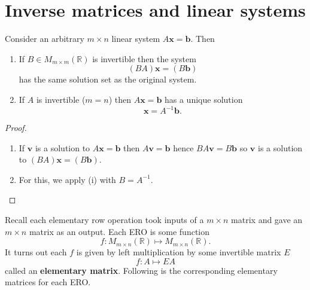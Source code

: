 \section{Inverse matrices and linear systems}

\begin{lemma}
    Consider an arbitrary $m\times n$ linear system $A\bm x=\bm b$. Then
    \begin{enumerate}
        \item If $B\in M_{m\times m}(\mathbb R)$ is invertible then the system \[(BA)\bm x=(B\bm b)\] has the same solution set as the original system.
        
        \item If $A$ is invertible ($m=n$) then $A\bm x=\bm b$ has a unique solution \[\bm x=A^{-1}\bm b.\]
    \end{enumerate}
\end{lemma}

\begin{proof}
    \begin{enumerate}
        \item If $\bm v$ is a solution to $A\bm x=\bm b$ then $A\bm v=\bm b$ hence $BA\bm v=B\bm b$ so $\bm v$ is a solution to $(BA)\bm x=(B\bm b)$.
        
        \item For this, we apply (i) with $B=A^{-1}$.
    \end{enumerate}
\end{proof}

Recall each elementary row operation took inputs of a $m\times n$ matrix and gave an $m\times n$ matrix as an output. Each ERO is some function \[f:M_{m\times n}(\mathbb R)\mapsto M_{m\times n}(\mathbb R).\] It turns out each $f$ is given by left multiplication by some invertible matrix $E$ \[f:A\mapsto EA\] called an \textbf{elementary matrix}. Following is the corresponding elementary matrices for each ERO.


